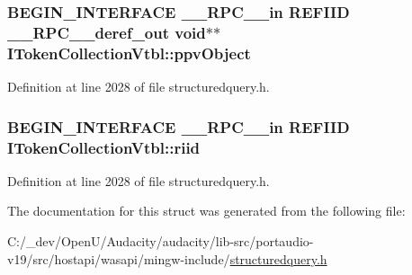 \subsubsection[{\texorpdfstring{ppv\+Object}{ppvObject}}]{\setlength{\rightskip}{0pt plus 5cm}B\+E\+G\+I\+N\+\_\+\+I\+N\+T\+E\+R\+F\+A\+CE {\bf \+\_\+\+\_\+\+R\+P\+C\+\_\+\+\_\+in} {\bf R\+E\+F\+I\+ID} {\bf \+\_\+\+\_\+\+R\+P\+C\+\_\+\+\_\+deref\+\_\+out} {\bf void}$\ast$$\ast$ I\+Token\+Collection\+Vtbl\+::ppv\+Object}\hypertarget{struct_i_token_collection_vtbl_aa707e89d6eac199c9039cfe3c8a2d3d2}{}\label{struct_i_token_collection_vtbl_aa707e89d6eac199c9039cfe3c8a2d3d2}


Definition at line 2028 of file structuredquery.\+h.

\subsubsection[{\texorpdfstring{riid}{riid}}]{\setlength{\rightskip}{0pt plus 5cm}B\+E\+G\+I\+N\+\_\+\+I\+N\+T\+E\+R\+F\+A\+CE {\bf \+\_\+\+\_\+\+R\+P\+C\+\_\+\+\_\+in} {\bf R\+E\+F\+I\+ID} I\+Token\+Collection\+Vtbl\+::riid}\hypertarget{struct_i_token_collection_vtbl_ac2b94a2a7839b1f516676e35e4f01535}{}\label{struct_i_token_collection_vtbl_ac2b94a2a7839b1f516676e35e4f01535}


Definition at line 2028 of file structuredquery.\+h.



The documentation for this struct was generated from the following file\+:\begin{DoxyCompactItemize}
\item 
C\+:/\+\_\+dev/\+Open\+U/\+Audacity/audacity/lib-\/src/portaudio-\/v19/src/hostapi/wasapi/mingw-\/include/\hyperlink{structuredquery_8h}{structuredquery.\+h}\end{DoxyCompactItemize}
